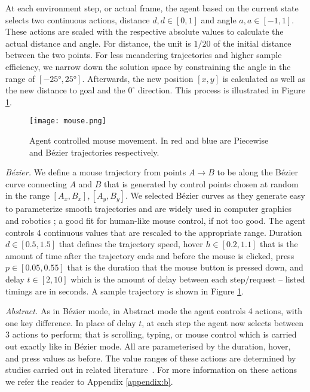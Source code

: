 At each environment step, or actual frame, the agent based on the current state selects two continuous actions, distance $d, d \in [0,1]$ and angle $a, a \in [-1,1]$.
These actions are scaled with the respective absolute values to calculate the actual distance and angle.
For distance, the unit is $1/20$ of the initial distance between the two points.
For less meandering trajectories and higher sample efficiency, we narrow down the solution space by constraining the angle in the range of $[\ang{-25}, \ang{25}]$.
Afterwards, the new position $[x,y]$ is calculated as well as the new distance to goal and the $0^{\circ}$ direction.
This process is illustrated in Figure \ref{mouse}.

\begin{figure}
\centerline{\texttt{[image: mouse.png]}}
\caption{Agent controlled mouse movement. In red and blue are Piecewise and Bézier trajectories respectively.}
\label{mouse}
\end{figure}

\emph{Bézier.} We define a mouse trajectory from points $A \rightarrow B$ to be along the Bézier curve connecting $A$ and $B$ that is generated by control points chosen at random in the range $[A_x,B_x], [A_y,B_y]$.
We selected Bézier curves as they generate easy to parameterize smooth trajectories and are widely used in computer graphics and robotics \cite{tharwat2019intelligent, wang2020using}; a good fit for human-like mouse control, if not too good.
The agent controls 4 continuous values that are rescaled to the appropriate range.
Duration $d \in [0.5,1.5]$ that defines the trajectory speed, hover $h \in [0.2,1.1]$ that is the amount of time after the trajectory ends and before the mouse is clicked, press $p \in [0.05,0.55]$ that is the duration that the mouse button is pressed down, and delay $t \in [2,10]$ which is the amount of delay between each step/request -- listed timings are in seconds.
A sample trajectory is shown in Figure \ref{mouse}.

\emph{Abstract.} As in Bézier mode, in Abstract mode the agent controls 4 actions, with one key difference.
In place of delay $t$, at each step the agent now selects between 3 actions to perform; that is scrolling, typing, or mouse control which is carried out exactly like in Bézier mode.
All are parameterised by the duration, hover, and press values as before.
The value ranges of these actions are determined by studies carried out in related literature~\cite{dhakal2018observations, katerina2018mouse}.
For more information on these actions we refer the reader to Appendix \ref{appendix:b}.

